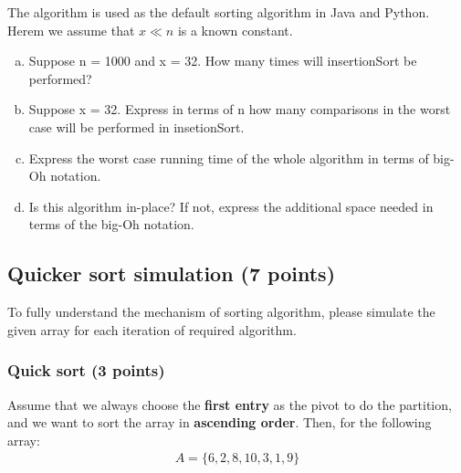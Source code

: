 \documentclass[11pt]{exam}
\begin{document}
The algorithm is used as the default sorting algorithm in Java and Python. Herem we assume that $x \ll n$ is a known constant.
\begin{enumerate}[(a)]
\item Suppose n = 1000 and x = 32. How many times will insertionSort be performed?

\item Suppose x = 32. Express in terms of n how many comparisons in the worst case will be performed in insetionSort.

\item Express the worst case running time of the whole algorithm in terms of big-Oh notation.

\item Is this algorithm in-place? If not, express the additional space needed in terms of the big-Oh notation.

\end{enumerate}

\begin{solution}
\end{solution}

\subsection{Quicker sort simulation (7 points)}
To fully understand the mechanism of sorting algorithm, please simulate the given array for each iteration of required algorithm.

\subsubsection{Quick sort (3 points)}

Assume that we always choose the \textbf{first entry} as the pivot to do the partition, and we want to sort the array in \textbf{ascending order}. Then, for the following array:
\begin{align*}
A = \{6, 2, 8, 10, 3, 1, 9\}
\end{align*}
\end{document}
